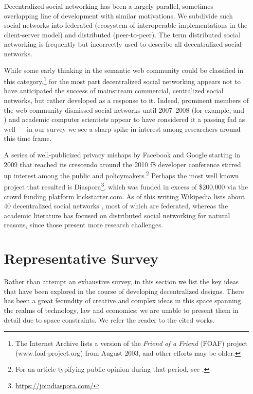 \documentclass{acm_proc_article-sp}
\begin{document}
Decentralized social networking has been a largely parallel, sometimes overlapping line of development with similar motivations. We subdivide such social networks into federated (ecosystem of interoperable implementations in the client-server model) and distributed (peer-to-peer). The term distributed social networking is frequently but incorrectly used to describe all decentralized social networks.

While some early thinking in the semantic web community could be classified in this category,\footnote{The Internet Archive lists a version of the {\em Friend of a Friend} (FOAF) project (www.foaf-project.org) from August 2003, and other efforts may be older.} for the most part decentralized social networking appears not to have anticipated the success of mainstream commercial, centralized social networks, but rather developed as a response to it. Indeed, prominent members of the web community dismissed social networks until 2007--2008 (for example, \cite{atwood} and \cite{winer}) and academic computer scientists appear to have considered it a passing fad as well --- in our survey we see a sharp spike in interest among researchers around this time frame.

A series of well-publicized privacy mishaps by Facebook and Google starting in 2009 that reached its crescendo around the 2010 f8 developer conference stirred up interest among the public and policymakers.\footnote{For an article typifying public opinion during that period, see \cite{rogue}.} Perhaps the most well known project that resulted is Diaspora\footnote{\url{https://joindiaspora.com/}}, which was funded in excess of \$200,000 via the crowd funding platform kickstarter.com. As of this writing Wikipedia lists about 40 decentralized social networks \cite{WP:DSN}, most of which are federated, whereas the academic literature has focused on distributed social networking for natural reasons, since those present more research challenges.

\section{Representative Survey}
\label{sec:RepresentativeSurvey}

Rather than attempt an exhaustive survey, in this section we list the key ideas that have been explored in the course of developing decentralized designs. There has been a great fecundity of creative and complex ideas in this space spanning the realms of technology, law and economics; we are unable to present them in detail due to space constraints. We refer the reader to the cited works.
\end{document}
